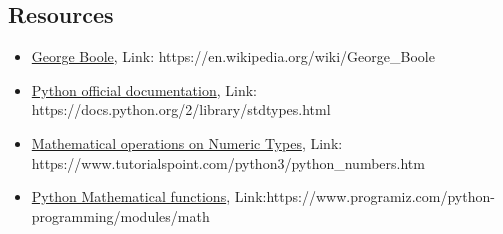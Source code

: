 \documentclass[11pt]{article}
\begin{document}
    \subsection{Resources}\label{resources}

    \begin{itemize}
\item
  \href{https://en.wikipedia.org/wiki/George_Boole}{George Boole}, Link:
  https://en.wikipedia.org/wiki/George\_Boole
\item
  \href{https://docs.python.org/2/library/stdtypes.html}{Python official
  documentation}, Link: https://docs.python.org/2/library/stdtypes.html
\item
  \href{https://www.tutorialspoint.com/python3/python_numbers.htm}{Mathematical
  operations on Numeric Types}, Link:
  https://www.tutorialspoint.com/python3/python\_numbers.htm
\item
  \href{https://www.programiz.com/python-programming/modules/math}{Python
  Mathematical functions},
  Link:https://www.programiz.com/python-programming/modules/math
\end{itemize}


    
    
    
    
\end{document}
